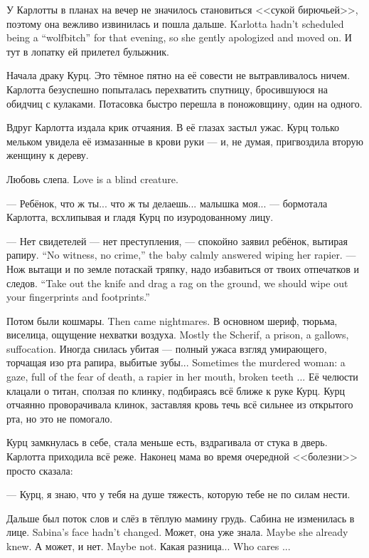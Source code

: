 {У Карлотты в планах на вечер не значилось становиться <<сукой бирючьей>>, поэтому она вежливо извинилась и пошла дальше.}
{Karlotta hadn't scheduled being a ``wolfbitch'' for that evening, so she gently apologized and moved on.}
И тут в лопатку ей прилетел булыжник.

Начала драку Курц.
Это тёмное пятно на её совести не вытравливалось ничем.
Карлотта безуспешно попыталась перехватить спутницу, бросившуюся на обидчиц с кулаками.
Потасовка быстро перешла в поножовщину, один на одного.

Вдруг Карлотта издала крик отчаяния.
В её глазах застыл ужас.
Курц только мельком увидела её измазанные в крови руки --- и, не думая, пригвоздила вторую женщину к дереву.

{Любовь слепа.}
{Love is a blind creature.}

--- Ребёнок, что ж ты... что ж ты делаешь... малышка моя... --- бормотала Карлотта, всхлипывая и гладя Курц по изуродованному лицу.

{--- Нет свидетелей --- нет преступления, --- спокойно заявил ребёнок, вытирая рапиру.}
{``No witness, no crime,'' the baby calmly answered wiping her rapier.}
{--- Нож вытащи и по земле потаскай тряпку, надо избавиться от твоих отпечатков и следов.}
{``Take out the knife and drag a rag on the ground, we should wipe out your fingerprints and footprints.''}

{Потом были кошмары.}
{Then came nightmares.}
{В основном шериф, тюрьма, виселица, ощущение нехватки воздуха.}
{Mostly the Scherif, a prison, a gallows, suffocation.}
{Иногда снилась убитая --- полный ужаса взгляд умирающего, торчащая изо рта рапира, выбитые зубы...}
{Sometimes the murdered woman: a gaze, full of the fear of death, a rapier in her mouth, broken teeth ...}
Её челюсти клацали о титан, сползая по клинку, подбираясь всё ближе к руке Курц.
Курц отчаянно проворачивала клинок, заставляя кровь течь всё сильнее из открытого рта, но это не помогало.

Курц замкнулась в себе, стала меньше есть, вздрагивала от стука в дверь.
Карлотта приходила всё реже.
Наконец мама во время очередной <<болезни>> просто сказала:

--- Курц, я знаю, что у тебя на душе тяжесть, которую тебе не по силам нести.

Дальше был поток слов и слёз в тёплую мамину грудь.
{Сабина не изменилась в лице.}
{Sabina's face hadn't changed.}
{Может, она уже знала.}
{Maybe she already knew.}
{А может, и нет.}
{Maybe not.}
{Какая разница...}
{Who cares ...}

